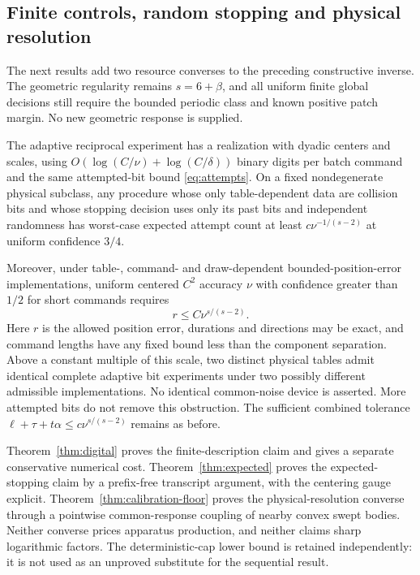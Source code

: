 \subsection{Finite controls, random stopping and physical resolution}
The next results add two resource converses to the preceding constructive
inverse. The geometric regularity remains $s=6+\beta$, and all uniform
finite global decisions still require the bounded periodic class and
known positive patch margin. No new geometric response is supplied.

\begin{theorem}
\label{thm:resources}
The adaptive reciprocal experiment has a realization with dyadic centers
and scales, using $O(\log(C/\nu)+\log(C/\delta))$ binary digits per
batch command and the same attempted-bit bound
\eqref{eq:attempts}. On a fixed nondegenerate physical subclass, any
procedure whose only table-dependent data are collision bits and whose
stopping decision uses only its past bits and independent randomness
has worst-case expected attempt count at least
$c\nu^{-1/(s-2)}$ at uniform confidence $3/4$.

Moreover, under table-, command- and draw-dependent bounded-position-error
implementations,
uniform centered $C^2$ accuracy $\nu$ with confidence greater than
$1/2$ for short commands requires
\[
                            r\le C\nu^{s/(s-2)}.
\]
Here $r$ is the allowed position error, durations and directions may
be exact, and command lengths have any fixed bound less than the
component separation. Above a constant multiple of this scale,
two distinct physical tables admit identical complete adaptive bit
experiments under two possibly different admissible implementations.
No identical common-noise device is asserted. More attempted
bits do not remove this obstruction. The sufficient combined tolerance
$\ell+\tau+t\alpha\le c\nu^{s/(s-2)}$ remains as before.
\end{theorem}

Theorem~\ref{thm:digital} proves the finite-description claim and gives
a separate conservative numerical cost. Theorem~\ref{thm:expected}
proves the expected-stopping claim by a prefix-free transcript argument,
with the centering gauge explicit. Theorem~\ref{thm:calibration-floor}
proves the physical-resolution converse through a pointwise common-response
coupling of nearby convex swept bodies. Neither converse prices
apparatus production, and neither claims sharp logarithmic factors.
The deterministic-cap lower bound is retained independently: it is
not used as an unproved substitute for the sequential result.
